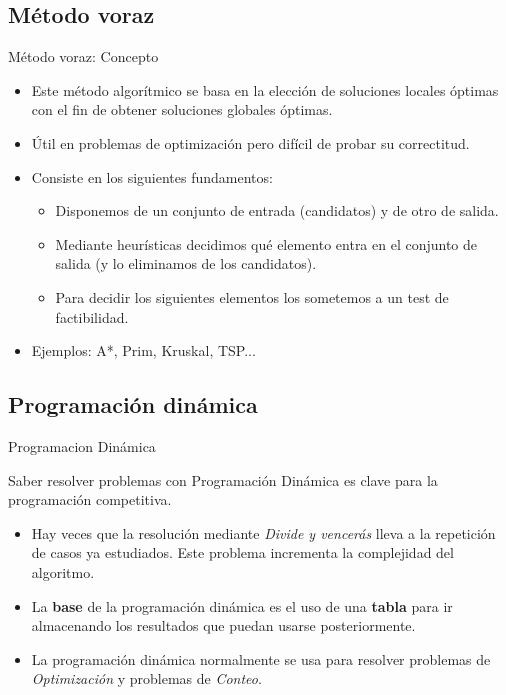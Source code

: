 \documentclass[10pt,handout]{beamer}
\begin{document}
\subsection{Método voraz}
\begin{frame}{Método voraz: Concepto}
  \begin{itemize}
  \item Este método algorítmico se basa en la elección de soluciones locales óptimas
    con el fin de obtener soluciones globales óptimas. \pause
  \item Útil en problemas de optimización pero difícil de probar su correctitud. \pause
  \item Consiste en los siguientes fundamentos: \pause
    \begin{itemize}
    \item Disponemos de un conjunto de entrada (candidatos) y de otro de salida. \pause
    \item Mediante heurísticas decidimos qué elemento entra en el conjunto de salida
      (y lo eliminamos de los candidatos). \pause
    \item Para decidir los siguientes elementos los sometemos a un test de factibilidad. \pause
    \end{itemize}
  \item Ejemplos: A*, Prim, Kruskal, TSP...
  \end{itemize}
\end{frame}

\subsection{Programación dinámica}


\begin{frame}{Programacion Dinámica}

  Saber resolver problemas con Programación Dinámica es clave para la
  programación competitiva.

  \begin{itemize}
  \item Hay veces que la resolución mediante \emph{Divide y vencerás}
    lleva a la repetición de casos ya estudiados. Este problema
    incrementa la complejidad del algoritmo.
    
  \item La \textbf{base} de la programación dinámica es el uso de una
    \textbf{tabla} para ir almacenando los resultados que puedan
    usarse posteriormente.

  \item La programación dinámica normalmente se usa para resolver
    problemas de \emph{Optimización} y problemas de \emph{Conteo}.

  \end{itemize}
\end{frame}
\end{document}
